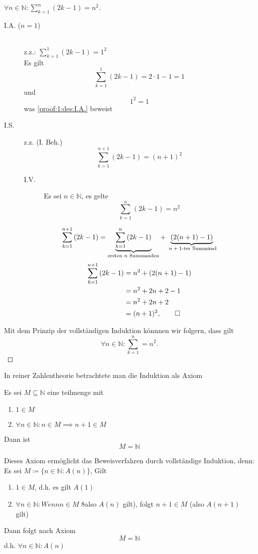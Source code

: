 \documentclass[a4paper, parskip = true, fleqn, headsepline = true]{scrartcl}
\DeclareRobustCommand{\qed}{%
	\ifmmode \tag*{$\Box$}%
	\else \leavevmode\unskip\penalty9999 \hbox{}\nobreak\hfill\quad\hbox{$\Box$}%
	\fi%
}
\newcommand{\N}{\mathbb{N}}
\begin{document}
\begin{task}
	\begin{proof}[$ \forall n \in \N : \sum_{k = 1}^{n}\left( 2k - 1 \right) = n^2 $]
		\begin{description}
			\item[I.A. ($ n = 1 $)]\label{proof:1:des:I.A.}~\\
				z.z.: $ \sum_{k = 1}^{1}\left( 2k - 1 \right) = 1^2 $\\
				Es gilt
				\[ \sum_{k = 1}^{1}\left( 2k - 1 \right) = 2 \cdot 1 - 1 = 1 \]
				und
				\[ 1^2 = 1 \]
				was \ref{proof:1:des:I.A.} beweist
			\item[I.S.] z.z. (I. Beh.)
				\[ \sum_{k = 1}^{n + 1}\left( 2k - 1 \right) = ( n + 1)^2 \]
				\begin{description}
					\item[I.V.] \label{proof:1:des:I.V.} Es sei $ n \in \N $, es gelte
						\[ \sum_{k=1}^{n}\left( 2k - 1 \right) = n^2 \]
				\end{description}
				\[ \sum_{k = 1}^{n + 1}\left( 2k - 1 \right) = \underbrace{\sum_{k = 1}^{n}\left( 2k - 1\right)}_{\text{ersten $ n $ Summanden}} + \underbrace{\left( 2( n + 1 ) - 1 \right)}_{\text{ $n + 1 $-ter Summand}} \]
				\begin{align*}
					\sum_{k = 1}^{n + 1}\left( 2k - 1 \right) &= n^2 + \left( 2 ( n + 1 ) - 1 \right)\\
						~&= n^2 + 2n + 2 - 1\\
						~&= n^2 + 2n + 2\\
						~&= ( n + 1 )^2, \qed
				\end{align*}
		\end{description}
		Mit dem Prinzip der vollständigen Induktion könnnen wir folgern, dass gilt
		\[ \forall n \in \N : \sum_{k = 1}^{n} = n^2 .\]
	\end{proof}
\end{task}

In reiner Zahlentheorie betrachtete man die Induktion als Axiom
\begin{axiom}[Induktionsaxiom]
	Es sei $ M \subseteq \N $ eine teilmenge mit
	\begin{enumerate}[label=(\roman*)]
		\item $ 1 \in M $
		\item $ \forall n \in \N : n \in M \implies n + 1 \in M $
	\end{enumerate}
	Dann ist
	\[ M = \N \]\par
	Dieses Axiom ermöglicht das Beweisverfahren durch vollständige Induktion, denn:\\
	Es sei $  M \coloneqq \{ n \in \N : A(n) \} $, Gilt
	\begin{enumerate}[label=(\roman*)]
		\item $ 1 \in M $, d.h. es gilt $ A(1) $
		\item $ \forall n \in \N : Wenn n \in M $ 8also $ A(n) $ gilt), folgt $ n + 1 \in M $ (also $ A( n + 1 ) $ gilt)
	\end{enumerate}
	Dann folgt nach Axiom
	\[ M = \N \]
	d.h. $ \forall n \in \N : A(n) $
\end{axiom}
\end{document}
